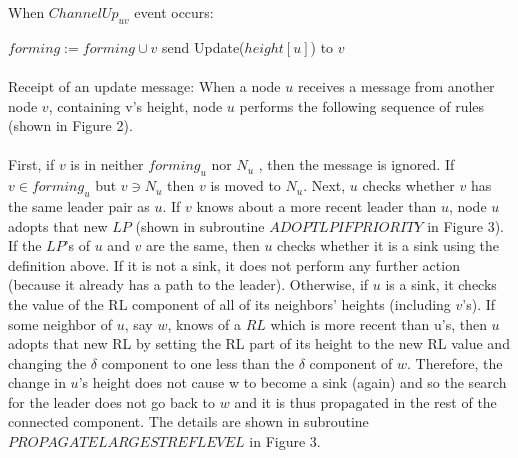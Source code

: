 \begin{algorithm}
	\caption{When $ChannelUp_{uv}$ event occurs:}
	\begin{algorithmic}[1]
		
	\State $forming := forming \cup {v}$
	\State send Update($height[u]$) to $v$
		
	\end{algorithmic}
\end{algorithm}

\paragraph{}Receipt of an update message: When a node $u$ receives a message from another node $v$, containing v’s height, node $u$ performs the following sequence of rules (shown in Figure 2).
\paragraph{}First, if $v$ is in neither $forming_u$ nor $N_u$ , then the message is ignored. If $v \in forming_u$ but $v \ni N_u$ then $v$ is moved to $N_u$. Next, $u$ checks whether $v$ has the same leader pair as $u$. If $v$ knows about a more recent leader than $u$, node $u$ adopts that new $LP$ (shown in subroutine $ADOPTLPIFPRIORITY$ in Figure 3). If the $LP$’s of $u$ and $v$ are the same, then $u$ checks whether it is a sink using the definition above. If it is not a sink, it does not perform any further action (because it already has a path to the leader). Otherwise, if $u$ is a sink, it checks the value of the RL component of all of its neighbors’ heights (including $v$’s). If some neighbor of $u$, say $w$, knows of a $RL$ which is more recent than u’s, then $u$ adopts that new RL by setting the RL part of its height to the new RL value and changing the $\delta$ component to one less than the $\delta$ component of $w$. Therefore, the change in $u$’s height does not cause w to become a sink (again) and so the search for the leader does not go back to $w$ and it is thus propagated in the rest of the connected component. The details are shown in subroutine $PROPAGATELARGESTREFLEVEL$ in Figure 3.
